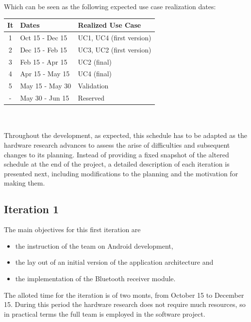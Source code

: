 			Which can be seen as the following expected use case realization dates:\\

			\begin{tabular}{| c | l | l |} %
				\hline
				It & Dates & Realized Use Case \\ \hline
				1 & Oct 15 - Dec 15 & UC1, UC4 (first version)\\ \hline
				2 & Dec 15 - Feb 15 & UC3, UC2 (first version)\\ \hline
				3 & Feb 15 - Apr 15 & UC2 (final) \\ \hline
				4 & Apr 15 - May 15 & UC4 (final) \\ \hline
				5 & May 15 - May 30 & Validation \\ \hline
				- & May 30 - Jun 15 & Reserved \\
				\hline
			\end{tabular}\\\\

			Throughout the development, as expected, this schedule has to be adapted as the hardware research advances to assess the arise of difficulties and subsequent changes to its planning. Instead of providing a fixed snapshot of the altered schedule at the end of the project, a detailed description of each iteration is presented next, including modifications to the planning and the motivation for making them.

		\subsection{Iteration 1}

			The main objectives for this first iteration are
			\begin{itemize} 
				\item the instruction of the team on Android development, 
				\item the lay out of an initial version of the application architecture and
				\item the implementation of the Bluetooth receiver module.
			\end{itemize}

			The alloted time for the iteration is of two monts, from October 15 to December 15. During this period the hardware research does not require much resources, so in practical terms the full team is employed in the software project.\\

